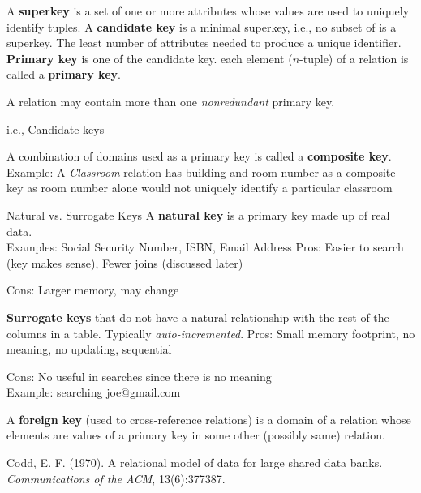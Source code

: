 \documentclass{article}
\begin{document}
   \begin{outline}
        \1 A \textbf{superkey} is a set of one or more attributes whose values are used to uniquely identify tuples.
                \2 A \textbf{candidate key} is a minimal superkey, i.e., no subset of is a superkey.  The least number of attributes needed to produce a unique identifier.  
                \2 \textbf{Primary key} is one of the candidate key. 
each element ($n$-tuple) of a relation is called a \textbf{primary key}.

                \3 A relation may contain more than one \textit{nonredundant}
                 primary key.

                        \4 i.e., Candidate keys
                 
                 \2 A combination of domains used as a primary key is called
a \textbf{composite key}. \\ Example: A \textit{Classroom} relation has building and room number as a composite key as room number alone would not uniquely identify a particular classroom  

                  \2 Natural vs. Surrogate Keys
                        \3 A \textbf{natural key} is a primary key made up of real data. \\ Examples: Social Security Number, ISBN, Email Address
                        \4 Pros: Easier to search (key makes sense), Fewer joins (discussed later)
                        
                        \4 Cons: Larger memory, may change

                   \3 \textbf{Surrogate keys} that do not have a natural relationship with the rest of the columns in a table.  Typically \textit{auto-incremented}.                          \4 Pros: Small memory footprint, no meaning, no updating, sequential
                        
                        \4 Cons: No useful in searches since there is no meaning \\ Example: searching joe@gmail.com

        \1 A \textbf{foreign key} (used to cross-reference relations) is
a domain of a relation whose elements are values of a primary key in some
other (possibly same) relation.     

\end{outline}

 
 
 
 



  
\begin{thebibliography}{99}

  Codd, E. F. (1970). A relational model of data for large shared data banks. \textit{Communications of the ACM}, 13(6):377387.
\end{thebibliography}



 
\end{document}
